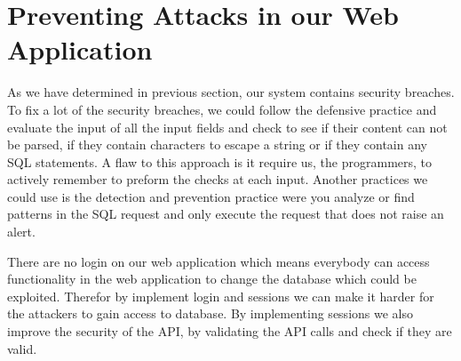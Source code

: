 \section{Preventing Attacks in our Web Application}
As we have determined in previous section, our system contains security breaches. To fix a lot of the security breaches, we could follow the defensive practice and evaluate the input of all the input fields and check to see if their content can not be parsed, if they contain characters to escape a string or if they contain any SQL statements. A flaw to this approach is it require us, the programmers, to actively remember to preform the checks at each input. Another practices we could use is the detection and prevention practice were you analyze or find patterns in the SQL request and only execute the request that does not raise an alert.

There are no login on our web application which means everybody can access functionality in the web application to change the database which could be exploited. Therefor by implement login and sessions we can make it harder for the attackers to gain access to database. By implementing sessions we also improve the security of the API, by validating the API calls and check if they are valid. 